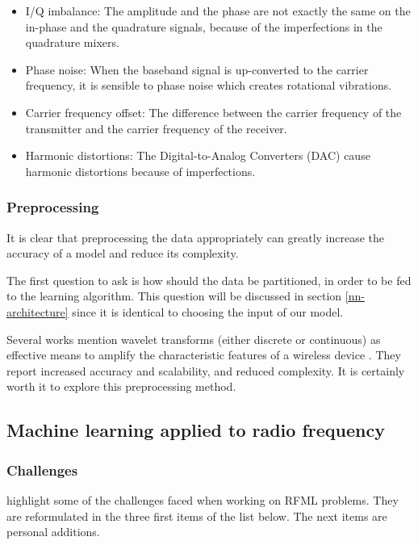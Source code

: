\begin{itemize}
  \item{I/Q imbalance:} The amplitude and the phase are not exactly the same on the in-phase and the quadrature signals, because of the imperfections in the quadrature mixers.
  \item{Phase noise:} When the baseband signal is up-converted to the carrier frequency, it is sensible to phase noise which creates rotational vibrations.
  \item{Carrier frequency offset:} The difference between the carrier frequency of the transmitter and the carrier frequency of the receiver.
  \item{Harmonic distortions:} The Digital-to-Analog Converters (DAC) cause harmonic distortions because of imperfections.
\end{itemize}

\subsubsection{Preprocessing}

It is clear that preprocessing the data appropriately can greatly increase the accuracy of a model and reduce its complexity.

The first question to ask is how should the data be partitioned, in order to be fed to the learning algorithm. This question will be discussed in section \ref{nn-architecture} since it is identical to choosing the input of our model.

Several works mention wavelet transforms (either discrete or continuous) as effective means to amplify the characteristic features of a wireless device \cite{xu_device_2015, oyedare_estimating_2019, youssef_machine_2017}. They report increased accuracy and scalability, and reduced complexity. It is certainly worth it to explore this preprocessing method.

\subsection{Machine learning applied to radio frequency}

\subsubsection{Challenges} \label{challenges}

\textcite{riyaz_deep_2018} highlight some of the challenges faced when working on RFML problems. They are reformulated in the three first items of the list below. The next items are personal additions.

